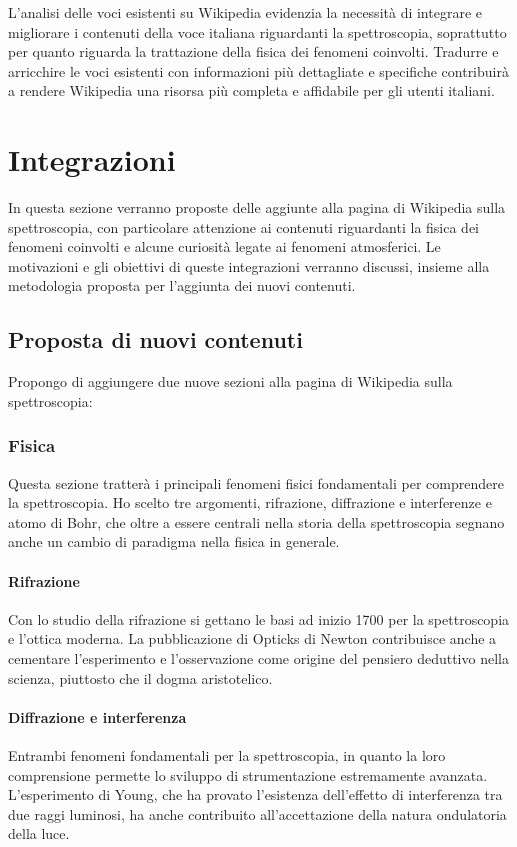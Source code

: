 \documentclass[12pt,a4paper]{report}
\begin{document}
L'analisi delle voci esistenti su Wikipedia evidenzia la necessità di integrare e migliorare i contenuti della voce italiana riguardanti la spettroscopia, soprattutto per quanto riguarda la trattazione della fisica dei fenomeni coinvolti. Tradurre e arricchire le voci esistenti con informazioni più dettagliate e specifiche contribuirà a rendere Wikipedia una risorsa più completa e affidabile per gli utenti italiani.

\section{Integrazioni}

In questa sezione verranno proposte delle aggiunte alla pagina di Wikipedia sulla spettroscopia, con particolare attenzione ai contenuti riguardanti la fisica dei fenomeni coinvolti e alcune curiosità legate ai fenomeni atmosferici. Le motivazioni e gli obiettivi di queste integrazioni verranno discussi, insieme alla metodologia proposta per l'aggiunta dei nuovi contenuti.

\subsection{Proposta di nuovi contenuti}

Propongo di aggiungere due nuove sezioni alla pagina di Wikipedia sulla spettroscopia:

\subsubsection{Fisica}

Questa sezione tratterà i principali fenomeni fisici fondamentali per comprendere la spettroscopia. Ho scelto tre argomenti, rifrazione, diffrazione e interferenze e atomo di Bohr, che oltre a essere centrali nella storia della spettroscopia segnano anche un cambio di paradigma nella fisica in generale.

\paragraph{Rifrazione} Con lo studio della rifrazione si gettano le basi ad inizio 1700 per la spettroscopia e l'ottica moderna. La pubblicazione di Opticks di Newton contribuisce anche a cementare l'esperimento e l'osservazione come origine del pensiero deduttivo nella scienza, piuttosto che il dogma aristotelico.
\paragraph{Diffrazione e interferenza} Entrambi fenomeni fondamentali per la spettroscopia, in quanto la loro comprensione permette lo sviluppo di strumentazione estremamente avanzata. L'esperimento di Young, che ha provato l'esistenza dell'effetto di interferenza tra due raggi luminosi, ha anche contribuito all'accettazione della natura ondulatoria della luce.
\end{document}
